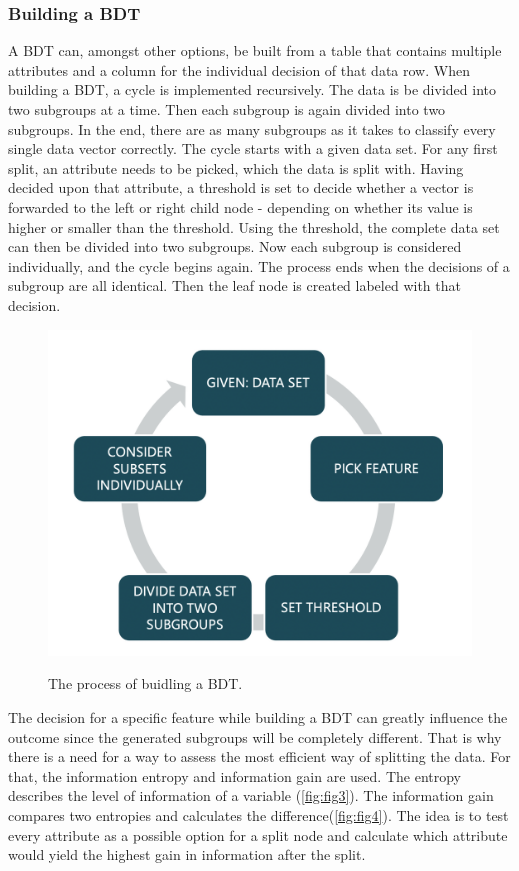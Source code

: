 \documentclass[
12pt,
headsepline,
bibliography=totoc,
twoside=semi,
fleqn
]{scrartcl}
\begin{document}
 \subsubsection{Building a BDT\label{sec:sec2-1-2}}
 A BDT can, amongst other options, be built from a table that contains multiple attributes and a column for the individual decision of that data row. When building a BDT, a cycle is implemented recursively. The data is be divided into two subgroups at a time. Then each subgroup is again divided into two subgroups. In the end, there are as many subgroups as it takes to classify every single data vector correctly. The cycle starts with a given data set. For any first split, an attribute needs to be picked, which the data is split with. Having decided upon that attribute, a threshold is set to decide whether a vector is forwarded to the left or right child node - depending on whether its value is higher or smaller than the threshold. Using the threshold, the complete data set can then be divided into two subgroups. Now each subgroup is considered individually, and the cycle begins again. The process ends when the decisions of a subgroup are all identical. Then the leaf node is created labeled with that decision. 

 \begin{figure}[H]
 \centering \includegraphics[scale=0.55]{BDT2.png}\label{fig:fig2}
 \caption{The process of buidling a BDT.}
 \end{figure}


 The decision for a specific feature while building a BDT can greatly influence the outcome since the generated subgroups will be completely different. That is why there is a need for a way to assess the most efficient way of splitting the data. For that, the information entropy and information gain are used. The entropy describes the level of information of a variable (\ref{fig:fig3}). The information gain compares two entropies and calculates the difference(\ref{fig:fig4}). The idea is to test every attribute as a possible option for a split node and calculate which attribute would yield the highest gain in information after the split. 
\end{document}

